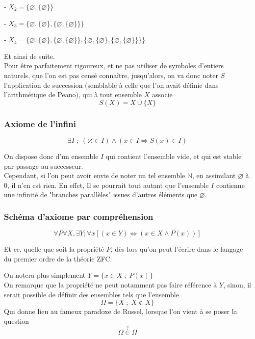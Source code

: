 \documentclass{article}
\begin{document}
- $X_2 = \{\varnothing , \{\varnothing\}\}$

- $X_3 = \{\varnothing , \{\varnothing\} , \{\varnothing, \{ \varnothing \} \} \}$

- $X_4 = \{\varnothing , \{\varnothing\} , \{\varnothing, \{ \varnothing \} \} , \{ \varnothing , \{\varnothing\} , \{\varnothing, \{ \varnothing \} \} \} \}$

Et ainsi de suite.
\\

Pour être parfaitement rigoureux, et ne pas utiliser de symboles d'entiers naturels, que l'on est pas censé connaître, jusqu'alors, on va donc noter $S$ l'application de succession (semblable à celle que l'on avait définie dans l'arithmétique de Peano), qui à tout ensemble $X$ associe
$$S(X) = X \cup \{X\}$$

\subsubsection{Axiome de l'infini}

$$\boxed{\exists I \; ; \; (\varnothing \in I) \wedge (x \in I \Rightarrow S(x) \in I)}$$

On dispose donc d'un ensemble $I$ qui contient l'ensemble vide, et qui est stable par passage au successeur.
\\

Cependant, si l'on peut avoir envie de noter un tel ensemble $\mathbb{N}$, en assimilant $\varnothing$ à $0$, il n'en est rien. En effet, Il se pourrait tout autant que l'ensemble $I$ contienne une infinité de "branches parallèles" issues d'autres éléments que $\varnothing$.

\subsubsection{Schéma d'axiome par compréhension}

$$\boxed{\forall P \forall X, \exists Y ; \forall x[(x \in Y) \Leftrightarrow (x \in X  \wedge P(x))]}$$

Et ce, quelle que soit la propriété $P$, dès lors qu'on peut l'écrire dans le langage du premier ordre de la théorie ZFC.

On notera plus simplement $Y = \{ x \in X \; ; \; P(x) \}$
\\

On remarque que la propriété ne peut notamment pas faire référence à $Y$, sinon, il serait possible de définir des ensembles tels que l'ensemble 
$$\Omega = \{X \; ; \; X \notin X \}$$
Qui donne lieu au fameux paradoxe de Russel, lorsque l'on vient à se poser la question $$\boxed{\Omega \overset{?}{\in} \Omega}$$
\end{document}
